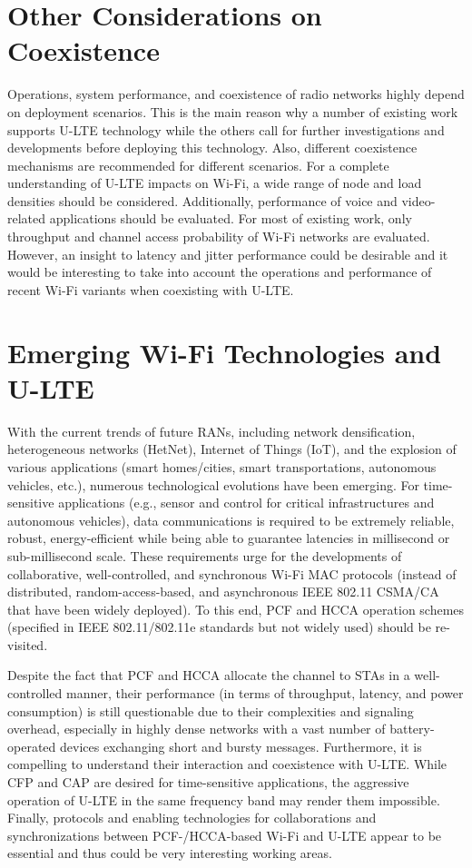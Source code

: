 \section{Other Considerations on Coexistence}
Operations, system performance, and coexistence of radio networks highly depend on deployment scenarios. This is the main reason why a number of existing work supports \mbox{U-LTE} technology while the others call for further investigations and developments before deploying this technology. Also, different coexistence mechanisms are recommended for different scenarios. For a complete understanding of \mbox{U-LTE} impacts on \mbox{Wi-Fi}, a wide range of node and load densities should be considered. Additionally, performance of voice and video-related applications should be evaluated. For most of existing work, only throughput and channel access probability of \mbox{Wi-Fi} networks are evaluated. However, an insight to latency and jitter performance could be desirable and it would be interesting to take into account the operations and performance of recent \mbox{Wi-Fi} variants when coexisting with \mbox{U-LTE}.

\section{Emerging Wi-Fi Technologies and U-LTE}
With the current trends of future RANs, including network densification, heterogeneous networks (HetNet), Internet of Things (IoT), and the explosion of various applications (smart homes/cities, smart transportations, autonomous vehicles, etc.), numerous technological evolutions have been emerging. For time-sensitive applications (e.g., sensor and control for critical infrastructures and autonomous vehicles), data communications is required to be extremely reliable, robust, energy-efficient while being able to guarantee latencies in millisecond or sub-millisecond scale. These requirements urge for the developments of collaborative, well-controlled, and synchronous \mbox{Wi-Fi} MAC protocols (instead of distributed, random-access-based, and asynchronous IEEE 802.11 CSMA/CA that have been widely deployed). To this end, PCF and HCCA operation schemes (specified in IEEE 802.11/802.11e standards but not widely used) should be re-visited.

Despite the fact that PCF and HCCA allocate the channel to STAs in a well-controlled manner, their performance (in terms of throughput, latency, and power consumption) is still questionable due to their complexities and signaling overhead, especially in highly dense networks with a vast number of battery-operated devices exchanging short and bursty messages. Furthermore, it is compelling to understand their interaction and coexistence with \mbox{U-LTE}. While CFP and CAP are desired for time-sensitive applications, the aggressive operation of \mbox{U-LTE} in the same frequency band may render them impossible. Finally, protocols and enabling technologies for collaborations and synchronizations between PCF-/HCCA-based \mbox{Wi-Fi} and \mbox{U-LTE} appear to be essential and thus could be very interesting working areas.

